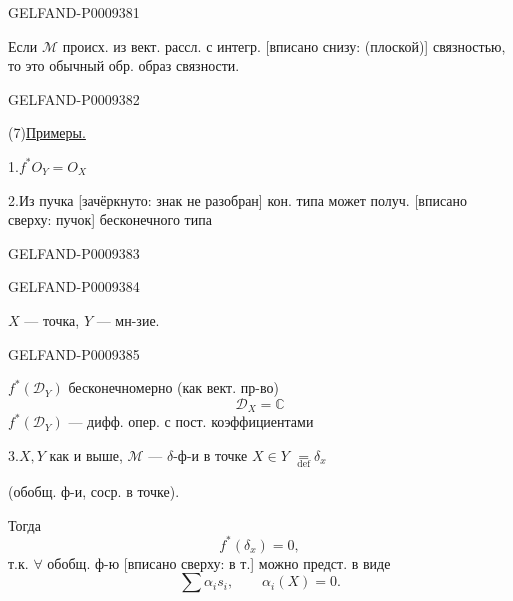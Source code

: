 \begin{GelfandAdjacentEvidence}{GELFAND-P000938}{1}

Если $\mathcal M$ происх. из вект. рассл. с интегр. [вписано снизу: (плоской)] связностью, то это обычный обр. образ связности.
\end{GelfandAdjacentEvidence}
\begin{GelfandAdjacentEvidence}{GELFAND-P000938}{2}


(7)\quad \underline{Примеры.}

1.\enspace $f^*O_Y=O_X$

2.\enspace Из пучка [зачёркнуто: знак не разобран] кон. типа может получ. [вписано сверху: пучок] бесконечного типа
\end{GelfandAdjacentEvidence}
\begin{GelfandAdjacentEvidence}{GELFAND-P000938}{3}

\end{GelfandAdjacentEvidence}
\begin{GelfandAdjacentEvidence}{GELFAND-P000938}{4}


$X$ --- точка, $Y$ --- мн-зие.
\end{GelfandAdjacentEvidence}
\begin{GelfandAdjacentEvidence}{GELFAND-P000938}{5}


$f^*(\mathcal D_Y)$ бесконечномерно (как вект. пр-во)
\[
 \mathcal D_X=\mathbb C
\]
$f^*(\mathcal D_Y)$ --- дифф. опер. с пост. коэффициентами

3.\enspace $X,Y$ как и выше, $\mathcal M$ --- $\delta$-ф-и в точке $X\in Y$
$\underset{\mathrm{def}}{=}\delta_x$

(обобщ. ф-и, соср. в точке).

Тогда
\[
 f^*(\delta_x)=0,
\]
т.к. $\forall$ обобщ. ф-ю [вписано сверху: в т.] можно предст. в виде
\[
 \sum \alpha_i s_i,\qquad \alpha_i(X)=0.
\]
\end{GelfandAdjacentEvidence}
